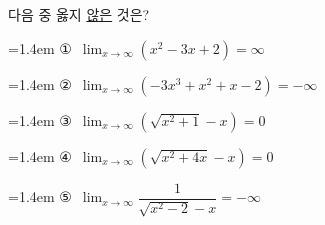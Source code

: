 다음 중 옳지 \underline{않은} 것은?
\par\medskip\par\noindent\hangindent=1.4em {\small ①}\ $\displaystyle\lim_{x\to\infty}(x^2-3x+2)=\infty$\par\noindent\hangindent=1.4em {\small ②}\ $\displaystyle\lim_{x\to\infty}(-3x^3+x^2+x-2)=-\infty$\par\noindent\hangindent=1.4em {\small ③}\ $\displaystyle\lim_{x\to\infty}(\sqrt{x^2+1}-x)=0$\par\noindent\hangindent=1.4em {\small ④}\ $\displaystyle\lim_{x\to\infty}(\sqrt{x^2+4x}-x)=0$\par\noindent\hangindent=1.4em {\small ⑤}\ $\displaystyle\lim_{x\to\infty}\dfrac{1}{\sqrt{x^2-2}-x}=-\infty$\par\medskip

